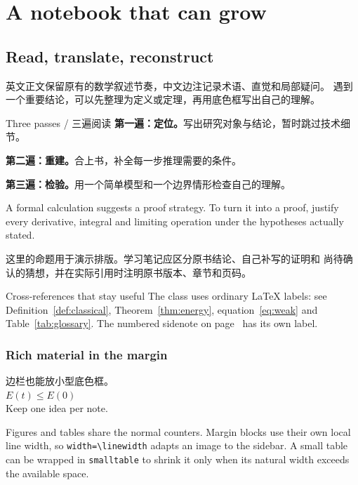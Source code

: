 \chapter{A notebook that can grow}
\section{Read, translate, reconstruct}
英文正文保留原有的数学叙述节奏，中文边注记录术语、直觉和局部疑问。
遇到一个重要结论，可以先整理为定义或定理，再用底色框写出自己的理解。

\begin{notebox}{Three passes / 三遍阅读}
\textbf{第一遍：定位。}写出研究对象与结论，暂时跳过技术细节。\par
\textbf{第二遍：重建。}合上书，补全每一步推理需要的条件。\par
\textbf{第三遍：检验。}用一个简单模型和一个边界情形检查自己的理解。
\end{notebox}

\begin{proposition}\label{prop:reading}
A formal calculation suggests a proof strategy. To turn it into a
proof, justify every derivative, integral and limiting operation under
the hypotheses actually stated.
\end{proposition}
\begin{remark}
这里的命题用于演示排版。学习笔记应区分原书结论、自己补写的证明和
尚待确认的猜想，并在实际引用时注明原书版本、章节和页码。
\end{remark}

\begin{readingbox}{Cross-references that stay useful}
The class uses ordinary \LaTeX{} labels: see
Definition~\ref{def:classical}, Theorem~\ref{thm:energy},
equation~\eqref{eq:weak} and Table~\ref{tab:glossary}.
The numbered sidenote on page~\pageref{sn:weak} has its own label.
\end{readingbox}

\subsection{Rich material in the margin}
\begin{marginblock}
  \begin{tcolorbox}[lumen panel,breakable=false,title={小结 / Recap},
    left=5pt,right=5pt,top=5pt,bottom=5pt,before skip=0pt,after skip=0pt]
    边栏也能放小型底色框。\\[3pt]
    $\displaystyle E(t)\leq E(0)$\\[3pt]
    Keep one idea per note.
  \end{tcolorbox}
\end{marginblock}
Figures and tables share the normal counters. Margin blocks use their
own local line width, so \verb|width=\linewidth| adapts an image to
the sidebar. A small table can be wrapped in \verb|smalltable| to shrink
it only when its natural width exceeds the available space.

